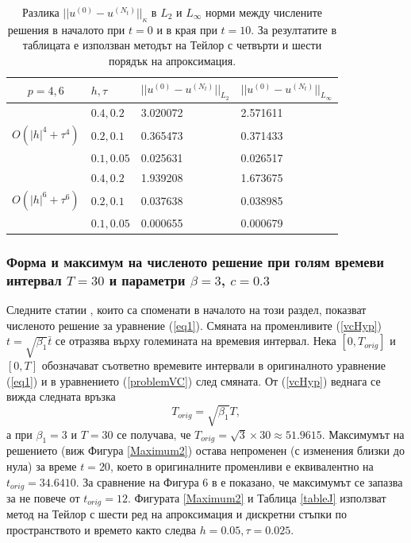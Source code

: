 \documentclass[a4paper]{article}
\newcommand{\rf}[1]{(\ref{#1})}
\theoremstyle{remark}
\begin{document}
\begin{large}
\begin{table}[ht]
\centering
\small
		\begin{tabular}{||c|l|l|l||}
			\hline
			\hline
  $p=4,6$   &  $h, \tau$ &  $||u^{(0)} - u^{(N_t)}||_{L_2}$  & $||u^{(0)} - u^{(N_t)}||_{L_\infty}$   \\
   		      \hline 
			\hline
           				& $0.4, 0.2$   &  3.020072 & 2.571611     \\
			\hline 
  $O(|h|^4+\tau^4)$ & $0.2, 0.1$   & 0.365473 & 0.371433      \\
			\hline 
           				& $0.1, 0.05$ & 0.025631 & 0.026517      \\
	   \hline
          \hline
           				& $0.4, 0.2$   & 1.939208 & 1.673675      \\
			\hline
  $O(|h|^6+\tau^6)$ & $0.2, 0.1$   & 0.037638 & 0.038985      \\
    \hline
           				& $0.1, 0.05$  & 0.000655 & 0.000679       \\
	   \hline
		\hline 
		\end{tabular}
		\caption{Разлика $||u^{(0)} - u^{(N_t)}||_\kappa$ в $L_2$ и $L_\infty$ норми между числените решения в началото при $t=0$ и в края при $t=10$. За резултатите в таблицата е използван методът на Тейлор с четвърти и шести порядък на апроксимация. }
\label{tableK}
\end{table}
\FloatBarrier

\subsubsection{Форма и максимум на численото решение при голям времеви интервал $T=30$ и параметри $\beta = 3$, $c=0.3$}
Следните статии \cite{ref21, ref20, ref23, ref22}, които са споменати в началото на този раздел, показват численото решение за уравнение \rf{eq1}. Смяната на променливите \rf{vcHyp} $t = \sqrt{\beta_1} \bar{t}$ се отразява върху големината на времевия интервал. Нека $[0, T_{orig}]$ и $[0, T]$ обозначават съответно времевите интервали в оригиналното уравнение \rf{eq1} и в уравнението \rf{problemVC} след смяната. От \rf{vcHyp} веднага се вижда следната връзка
$$
T_{orig} = \sqrt{\beta_1} T,
$$
а при $\beta_1 = 3$ и $T=30$ се получава, че $T_{orig} = \sqrt{3} \times 30 \approx 51.9615$. Максимумът на решението (виж Фигура \ref{Maximum2}) остава непроменен (с изменения близки до нула) за време $t=20$, което в оригиналните променливи е еквивалентно на $t_{orig}=34.6410$. За сравнение на Фигура 6 в \cite{ref21} е показано, че максимумът се запазва за не повече от $t_{orig}=12$. Фигурата \ref{Maximum2} и Таблица \ref{tableJ} използват метод на Тейлор с шести ред на апроксимация и дискретни стъпки по пространството и времето както следва $h=0.05, \tau = 0.025$.


\end{large}
\end{document}
